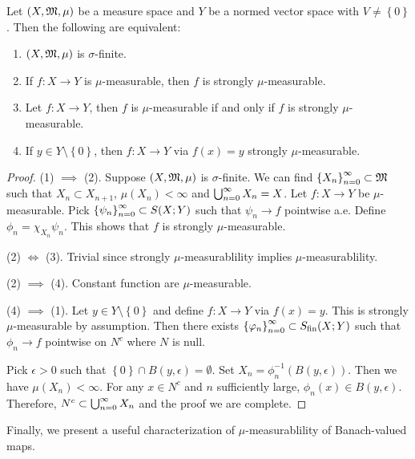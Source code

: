 \documentclass[a4paper]{article}
\begin{document}
\begin{thm}
  Let $(X,\mathfrak{M}, \mu)$ be a measure space and 
  $Y$ be a normed vector space with $V \neq \left\{ 0 
  \right\}$. Then the following are equivalent:
  \begin{enumerate}
    \item $(X, \mathfrak{M}, \mu)$ is $\sigma$-finite.
    \item If $f: X \to Y$ is $\mu$-measurable, then 
    $f$ is strongly $\mu$-measurable.
    \item Let $f: X \to Y$, then $f$ is $\mu$-measurable
    if and only if $f$ is strongly $\mu$-measurable.
    \item If $y \in Y \setminus \left\{ 0 \right\}$, 
    then $f: X \to Y$ via $f(x) = y$ strongly 
    $\mu$-measurable.
  \end{enumerate}
\end{thm}

\begin{proof}
  (1) $\implies$ (2). Suppose $(X, \mathfrak{M}, \mu)$ is 
  $\sigma$-finite. We can find $\left\{ X_n \right\}_{n=0}^\infty 
  \subset \mathfrak{M}$ such that $X_n \subset X_{n+1}$, 
  $\mu(X_n) < \infty$ and $\bigcup_{n=0}^\infty X_n = X$. 
  Let $f: X \to Y$ be $\mu$-measurable. Pick 
  $\left\{ \psi_n \right\}_{n=0}^\infty \subset S(X; Y)$ such that
  $\psi_n \to f$ pointwise a.e. Define 
  $\phi_n = \chi_{X_n} \psi_n$. This shows that 
  $f$ is strongly $\mu$-measurable.

  (2) $\iff$ (3). Trivial since strongly $\mu$-measurablility
  implies $\mu$-measurablility.

  (2) $\implies$ (4). Constant function are $\mu$-measurable.

  (4) $\implies$ (1). Let $y \in Y \setminus \left\{ 0 \right\}$
  and define $f : X \to Y$ via $f(x) = y$. This 
  is strongly $\mu$-measurable by assumption. 
  Then there exists $\left\{ \varphi_n \right\}_{n=0}^\infty \subset S_{\text{fin}}(X; Y)$ 
  such that $\phi_n \to f$ pointwise on $N^c$ where 
  $N$ is null. 

  Pick $\epsilon > 0$ such that $\left\{ 0 \right\} 
  \cap B(y, \epsilon) = \emptyset$. Set 
  $X_n = \phi_n^{-1} (B(y, \epsilon))$. Then we have 
  $\mu(X_n) < \infty$. For any $x \in N^c$ and $n$ 
  sufficiently large, $\phi_n(x) \in B(y, \epsilon)$.
  Therefore, $N^c \subset \bigcup_{n=0}^\infty X_n$ and 
  the proof we are complete.
\end{proof}

Finally, we present a useful characterization of 
$\mu$-measurablility of Banach-valued maps. 
\end{document}
